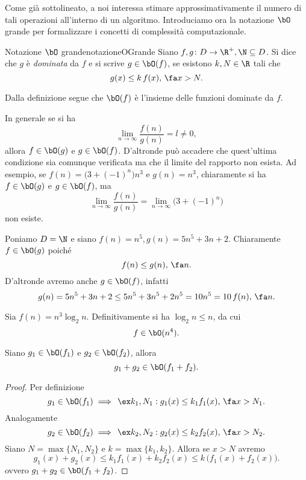 	Come già sottolineato, a noi interessa stimare approssimativamente il numero di tali operazioni all'interno di un algoritmo.
	Introduciamo ora la notazione \(\bO\) grande per formalizzare i concetti di complessità computazionale.

	\begin{defn}{Notazione \(\bO\) grande}{notazioneOGrande}
	Siano \(f,g\colon D \to \R^+, \N\subseteq D\).
	Si dice che \(g\) è \emph{dominata} da \(f\) e si scrive \(g\in \bO(f)\), se esistono \(k,N\in\R\) tali che
		\[
		g(x) \le k\,f(x) ,\,\fa x > N.
		\]
	\end{defn}

	\begin{notz}
	Dalla definizione segue che \(\bO(f)\) è l'insieme delle funzioni dominate da \(f\).
	\end{notz}

	\begin{oss}
	In generale se si ha
		\[
		\lim_{n\to \infty} \frac{f(n)}{g(n)} = l \neq 0,
		\]
	allora \(f\in \bO(g)\) e \(g\in \bO(f)\).
	D'altronde può accadere che quest'ultima condizione sia comunque verificata ma che il limite del rapporto non esista. Ad esempio, se \(f(n) = \big(3+(-1)^n\big)n^3\) e \(g(n)=n^3\), chiaramente si ha \(f\in \bO(g)\) e \(g\in \bO(f)\), ma 
		\[
		\lim_{n\to \infty} \frac{f(n)}{g(n)} = \lim_{n\to \infty} \big(3+(-1)^n\big)
		\]
	non esiste.
	\end{oss}

	\begin{ese}
	Poniamo \(D=\N\) e siano \(f(n) = n^5, g(n) = 5n^5+3n+2\).
	Chiaramente \(f\in \bO(g)\) poiché
		\[
		f(n) \le g(n),\,\fa n.
		\]
	D'altronde avremo anche \(g\in \bO(f)\), infatti
		\[
		g(n) = 5n^5+3n+2 \le 5n^5+3n^5+2n^5 = 10n^5 = 10\,f(n),\,\fa n.
		\]
	\end{ese}

	\begin{ese}
	Sia \(f(n) = n^3\log_2 n\).
	Definitivamente si ha \(\log_2 n \le n\), da cui
		\[
		f\in \bO(n^4).
		\]
	\end{ese}

	\begin{pr}
	Siano \(g_1\in \bO(f_1)\) e \(g_2\in \bO(f_2)\), allora
		\[
		g_1+g_2 \in \bO(f_1+f_2).
		\]
	\end{pr}

	\begin{proof}
	Per definizione
		\[
		g_1 \in \bO(f_1) \implies \,\ex k_1,N_1: g_1(x) \le k_1 f_1(x),\,\fa x > N_1.
		\]
	Analogamente
		\[
		g_2 \in \bO(f_2) \implies \,\ex k_2,N_2: g_2(x) \le k_2 f_2(x),\,\fa x > N_2.
		\]
	Siano \(N=\max\{N_1,N_2\}\) e \(k = \max\{k_1,k_2\}\). Allora se \(x>N\) avremo
		\[
		g_1(x)+g_2(x) \le k_1 f_1(x) + k_2 f_2(x) \le k\,\big(f_1(x)+f_2(x)\big).
		\]
	ovvero \(g_1+g_2\in \bO(f_1+f_2)\).
	\end{proof}

